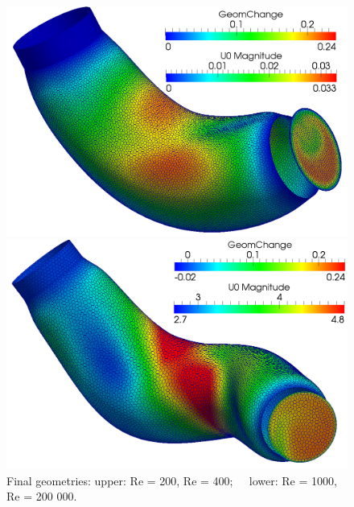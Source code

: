 \documentclass[8pt]{beamer}
\newcommand{\JJ }{ \mathcal{J}}
\begin{document}
{\begin{figure}
\begin{minipage}[b]{6 cm}
    \includegraphics[scale=0.12]{T090R1000I30.png}
  \end{minipage}
  \begin{minipage}[b]{4 cm}
    \includegraphics[scale=0.12]{I120R2e5I15.png}
  \end{minipage}
  \caption{Final geometries: upper: Re = 200, \; Re = 400; \qquad \qquad
\newline \textcolor{white}{.} \qquad \qquad \qquad \qquad \qquad \qquad \,  lower: Re = 1000, Re = 200 000.}
\end{figure}
}
\end{document}
